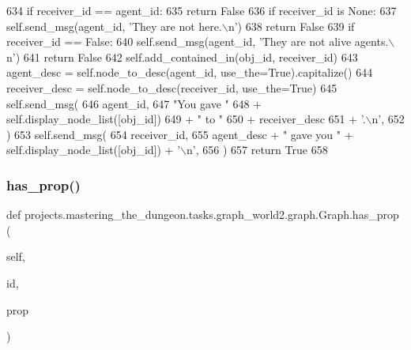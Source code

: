 \begin{DoxyCode}
634         \textcolor{keywordflow}{if} receiver\_id == agent\_id:
635             \textcolor{keywordflow}{return} \textcolor{keyword}{False}
636         \textcolor{keywordflow}{if} receiver\_id \textcolor{keywordflow}{is} \textcolor{keywordtype}{None}:
637             self.send\_msg(agent\_id, \textcolor{stringliteral}{'They are not here.\(\backslash\)n'})
638             \textcolor{keywordflow}{return} \textcolor{keyword}{False}
639         \textcolor{keywordflow}{if} receiver\_id == \textcolor{keyword}{False}:
640             self.send\_msg(agent\_id, \textcolor{stringliteral}{'They are not alive agents.\(\backslash\)n'})
641             \textcolor{keywordflow}{return} \textcolor{keyword}{False}
642         self.add\_contained\_in(obj\_id, receiver\_id)
643         agent\_desc = self.node\_to\_desc(agent\_id, use\_the=\textcolor{keyword}{True}).capitalize()
644         receiver\_desc = self.node\_to\_desc(receiver\_id, use\_the=\textcolor{keyword}{True})
645         self.send\_msg(
646             agent\_id,
647             \textcolor{stringliteral}{"You gave "}
648             + self.display\_node\_list([obj\_id])
649             + \textcolor{stringliteral}{" to "}
650             + receiver\_desc
651             + \textcolor{stringliteral}{'.\(\backslash\)n'},
652         )
653         self.send\_msg(
654             receiver\_id,
655             agent\_desc + \textcolor{stringliteral}{" gave you "} + self.display\_node\_list([obj\_id]) + \textcolor{stringliteral}{'\(\backslash\)n'},
656         )
657         \textcolor{keywordflow}{return} \textcolor{keyword}{True}
658 
\end{DoxyCode}
\mbox{\label{classprojects_1_1mastering__the__dungeon_1_1tasks_1_1graph__world2_1_1graph_1_1Graph_af002f18d01d8845e6a69ceb7ccc4a89f}} 
\subsubsection{\texorpdfstring{has\+\_\+prop()}{has\_prop()}}
{\footnotesize\ttfamily def projects.\+mastering\+\_\+the\+\_\+dungeon.\+tasks.\+graph\+\_\+world2.\+graph.\+Graph.\+has\+\_\+prop (\begin{DoxyParamCaption}\item[{}]{self,  }\item[{}]{id,  }\item[{}]{prop }\end{DoxyParamCaption})}




